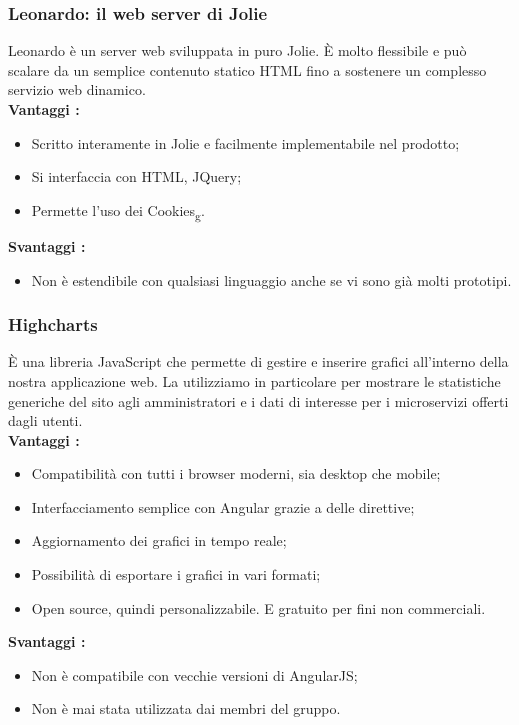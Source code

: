 {{		\subsubsection{Leonardo: il web server di Jolie}{
			Leonardo è un server web sviluppata in puro Jolie. È molto flessibile e può scalare da un semplice contenuto statico HTML fino a sostenere un complesso servizio web dinamico.\\
			\textbf{Vantaggi :}
			\begin{itemize}\itemsep1pt
				\item Scritto interamente in Jolie e facilmente implementabile nel prodotto;
				\item Si interfaccia con HTML, JQuery;
				\item Permette l'uso dei Cookies\textsubscript{g}.	
			\end{itemize}
			\textbf{Svantaggi :}
			\begin{itemize}\itemsep1pt
				\item Non è estendibile con qualsiasi linguaggio anche se vi sono già molti prototipi.
			\end{itemize}
		}
		\subsubsection{Highcharts}{
			È una libreria JavaScript che permette di gestire e inserire grafici all'interno della nostra applicazione web. La utilizziamo in particolare per mostrare le statistiche generiche del sito agli amministratori e i dati di interesse per i microservizi offerti dagli utenti. \\
			\textbf{Vantaggi :}
			\begin{itemize}\itemsep1pt
				\item Compatibilità con tutti i browser moderni, sia desktop che mobile;
				\item Interfacciamento semplice con Angular grazie a delle direttive;
				\item Aggiornamento dei grafici in tempo reale;
				\item Possibilità di esportare i grafici in vari formati;
				\item Open source, quindi personalizzabile. E gratuito per fini non commerciali.
			\end{itemize}
			\textbf{Svantaggi :}
			\begin{itemize}\itemsep1pt
				\item Non è compatibile con vecchie versioni di AngularJS;
				\item Non è mai stata utilizzata dai membri del gruppo.
			\end{itemize}
		}
}}
